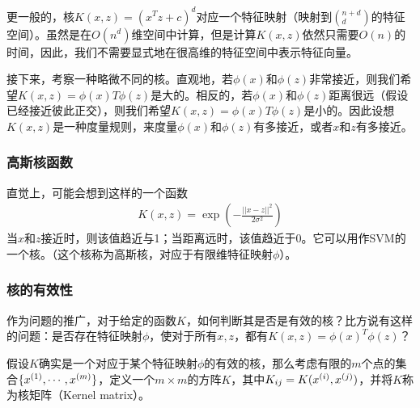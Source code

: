 更一般的，核$K(x,z)=(x^Tz+c)^d$对应一个特征映射（映射到$\left(_d^{n+d}\right)$的特征空间）。虽然是在$O(n^d)$维空间中计算，但是计算$K(x,z)$依然只需要$O(n)$的时间，因此，我们不需要显式地在很高维的特征空间中表示特征向量。

接下来，考察一种略微不同的核。直观地，若$\phi(x)$和$\phi(z)$非常接近，则我们希望$K(x,z)=\phi(x)T\phi(z)$是大的。相反的，若$\phi(x)$和$\phi(z)$距离很远（假设已经接近彼此正交），则我们希望$K(x,z)=\phi(x)T\phi(z)$是小的。因此设想$K(x,z)$是一种度量规则，来度量$\phi(x)$和$\phi(z)$有多接近，或者$x$和$z$有多接近。

\subsubsection{高斯核函数}
直觉上，可能会想到这样的一个函数
\begin{eqnarray}
K(x,z)=\exp\left(
-\frac{||x-z||^2}{2\sigma^2}
\right)
\end{eqnarray}
当$x$和$z$接近时，则该值趋近与1；当距离远时，该值趋近于0。它可以用作SVM的一个核。（这个核称为高斯核，对应于有限维特征映射$\phi$）。

\subsubsection{核的有效性}
作为问题的推广，对于给定的函数$K$，如何判断其是否是有效的核？比方说有这样的问题：是否存在特征映射$\phi$，使对于所有$x,z$，都有$K(x,z)=\phi(x)^T\phi(z)$？

假设$K$确实是一个对应于某个特征映射$\phi$的有效的核，那么考虑有限的$m$个点的集合$\{{x}^{({1})},\cdots,{x}^{({m})}\}$，定义一个$m\times m$的方阵$K$，其中$K_{ij}=K({x}^{({i})},{x}^{({j})})$，并将$K$称为核矩阵（Kernel matrix）。

